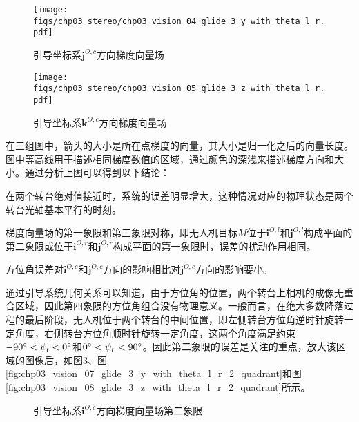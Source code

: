 \begin{figure}[!tb]
	\centering
	\texttt{[image: figs/chp03\_stereo/chp03\_vision\_04\_glide\_3\_y\_with\_theta\_l\_r.pdf]}	
	\caption{引导坐标系$\mathbf{j}^{O,c}$方向梯度向量场}
	\label{fig:chp03_vision_04_glide_3_y_with_theta_l_r}
\end{figure}

\begin{figure}[!tb]
	\centering
	\texttt{[image: figs/chp03\_stereo/chp03\_vision\_05\_glide\_3\_z\_with\_theta\_l\_r.pdf]}	
	\caption{引导坐标系$\mathbf{k}^{O,c}$方向梯度向量场}
	\label{fig:chp03_vision_05_glide_3_z_with_theta_l_r}
\end{figure}

在三组图中，箭头的大小是所在点梯度的向量，其大小是归一化之后的向量长度。图中等高线用于描述相同梯度数值的区域，通过颜色的深浅来描述梯度方向和大小。通过分析上图可以得到以下结论：
\begin{compactenum}
\item
在两个转台绝对值接近时，系统的误差明显增大，这种情况对应的物理状态是两个转台光轴基本平行的时刻。
\item
梯度向量场的第一象限和第三象限对称，即无人机目标$M$位于$\mathbf{i}^{O,l}$和$\mathbf{j}^{O,l}$构成平面的第二象限或位于$\mathbf{i}^{O,r}$和$\mathbf{j}^{O,r}$构成平面的第一象限时，误差的扰动作用相同。
\item
方位角误差对$\mathbf{i}^{O,c}$和$\mathbf{j}^{O,c}$方向的影响相比对$\mathbf{j}^{O,c}$方向的影响要小。
\end{compactenum}
 

通过引导系统几何关系可以知道，由于方位角的位置，两个转台上相机的成像无重合区域，因此第四象限的方位角组合没有物理意义。一般而言，在绝大多数降落过程的最后阶段，无人机位于两个转台的中间位置，即左侧转台方位角逆时针旋转一定角度，右侧转台方位角顺时针旋转一定角度，这两个角度满足约束
$ -90\degree < \psi_l < 0\degree$和$ 0\degree < \psi_r < 90\degree$。因此第二象限的误差是关注的重点，放大该区域的图像后，如图\ref{fig:chp03_vision_06_glide_3_x_with_theta_l_r_2_quadrant}、图\ref{fig:chp03_vision_07_glide_3_y_with_theta_l_r_2_quadrant}和图\ref{fig:chp03_vision_08_glide_3_z_with_theta_l_r_2_quadrant}所示。

\begin{figure}[htb]
	\centering
	 \qquad
	\caption{引导坐标系$\mathbf{i}^{O,c}$方向梯度向量场第二象限}
	\label{fig:chp03_vision_06_glide_3_x_with_theta_l_r_2_quadrant}
\end{figure}

